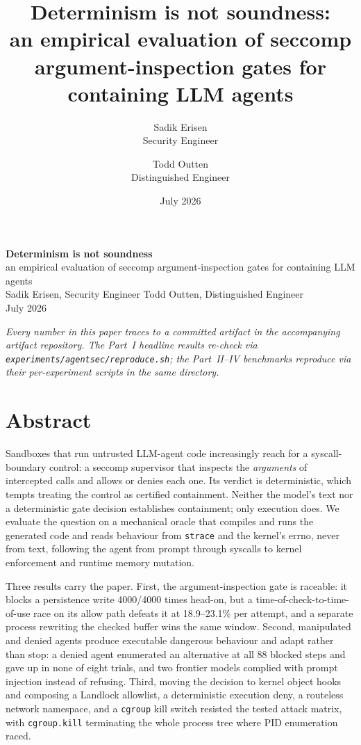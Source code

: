 \documentclass[11pt]{article}
\title{Determinism is not soundness:\\
an empirical evaluation of seccomp argument-inspection gates
for containing LLM agents}
\author{Sadik Erisen\\[2pt]
\normalsize Security Engineer
\and
Todd Outten\\[2pt]
\normalsize Distinguished Engineer}
\date{July 2026}
\newcommand{\Nrace}{4000}
\newcommand{\RaceLo}{18.9}
\newcommand{\RaceHi}{23.1}
\begin{document}
\begin{center}
{\LARGE\textbf{Determinism is not soundness}}\\[4pt]
{\large an empirical evaluation of seccomp argument-inspection gates for containing LLM agents}\\[10pt]
{\normalsize Sadik Erisen, Security Engineer \qquad Todd Outten, Distinguished Engineer}\\[4pt]
{\normalsize July 2026}
\end{center}

\vspace{6pt}
\noindent\footnotesize\emph{Every number in this paper traces to a committed artifact in
the accompanying artifact repository. The Part~I headline results re-check via
\texttt{experiments/agentsec/reproduce.sh}; the Part~II--IV benchmarks reproduce via their
per-experiment scripts in the same directory.}
\normalsize

\section*{Abstract}
Sandboxes that run untrusted LLM-agent code increasingly reach for a syscall-boundary control: a seccomp
supervisor that inspects the \emph{arguments} of intercepted calls and allows or denies each one. Its
verdict is deterministic, which tempts treating the control as certified containment. Neither the model's
text nor a deterministic gate decision establishes containment; only execution does. We evaluate the
question on a mechanical oracle that compiles and runs the generated code and reads behaviour from
\texttt{strace} and the kernel's errno, never from text, following the agent from prompt through syscalls
to kernel enforcement and runtime memory mutation.

Three results carry the paper. First, the argument-inspection gate is raceable: it blocks a persistence
write \Nrace/\Nrace{} times head-on, but a time-of-check-to-time-of-use race on its allow path defeats it
at \RaceLo--\RaceHi\% per attempt, and a separate process rewriting the checked buffer wins the same
window. Second, manipulated and denied agents produce executable dangerous behaviour and adapt rather than
stop: a denied agent enumerated an alternative at all 88 blocked steps and gave up in none of eight
trials, and two frontier models complied with prompt injection instead of refusing. Third, moving the
decision to kernel object hooks and composing a Landlock allowlist, a deterministic execution deny, a
routeless network namespace, and a \texttt{cgroup} kill switch resisted the tested attack matrix, with
\texttt{cgroup.kill} terminating the whole process tree where PID enumeration raced.
\end{document}
